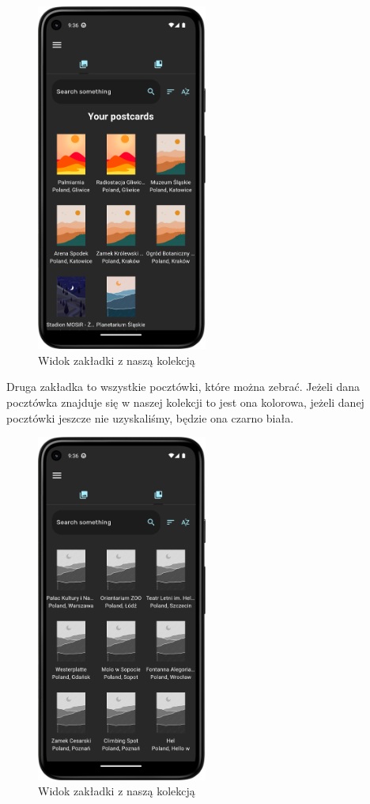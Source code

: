 \documentclass[a4paper,twoside,12pt]{book}
\begin{document}
\begin{figure}[H]
    \centering
    \includegraphics[width=0.5\textwidth]{mobile_ss/obrazki_nasze.png}
    \caption{Widok zakładki z naszą kolekcją}
\end{figure}

Druga zakładka to wszystkie pocztówki, które można zebrać. Jeżeli dana pocztówka znajduje się w naszej kolekcji to jest ona kolorowa, jeżeli danej pocztówki jeszcze nie uzyskaliśmy, będzie ona czarno biała. 

\begin{figure}[H]
    \centering
    \includegraphics[width=0.5\textwidth]{mobile_ss/obrazki_wszystkie.png}
    \caption{Widok zakładki z naszą kolekcją}
\end{figure}
\end{document}
